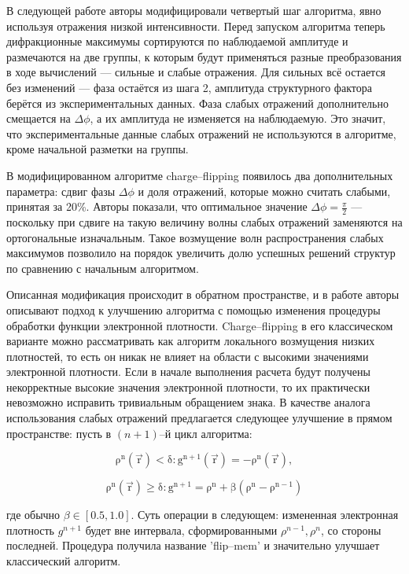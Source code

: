 В следующей работе \cite{oszlanyi_it_2005} авторы модифицировали четвертый шаг алгоритма, явно используя отражения низкой интенсивности. Перед запуском алгоритма теперь дифракционные максимумы сортируются по наблюдаемой амплитуде и размечаются на две группы, к которым будут применяться разные преобразования в ходе вычислений --- сильные и слабые отражения. Для сильных всё остается без изменений --- фаза остаётся из шага 2, амплитуда структурного фактора берётся из экспериментальных данных. Фаза слабых отражений дополнительно смещается на $\Delta\phi$, а их амплитуда не изменяется на наблюдаемую. Это значит, что экспериментальные данные слабых отражений не используются в алгоритме, кроме начальной разметки на группы.

В модифицированном алгоритме charge--flipping появилось два дополнительных параметра: сдвиг фазы $\Delta\phi$ и доля отражений, которые можно считать слабыми, принятая за 20\%. Авторы показали, что оптимальное значение $\Delta\phi = \frac{\pi}{2}$ --- поскольку при сдвиге на такую величину волны слабых отражений заменяются на ортогональные изначальным. Такое возмущение волн распространения слабых максимумов позволило на порядок увеличить долю успешных решений структур по сравнению с начальным алгоритмом.

Описанная модификация происходит в обратном пространстве, и в работе \cite{oszlanyi_charge_2008} авторы описывают подход к улучшению алгоритма с помощью изменения процедуры обработки функции электронной плотности. Charge--flipping в его классическом варианте можно рассматривать как алгоритм локального возмущения низких плотностей, то есть он никак не влияет на области с высокими значениями электронной плотности. Если в начале выполнения расчета будут получены некорректные высокие значения электронной плотности, то их практически невозможно исправить тривиальным обращением знака. В качестве аналога использования слабых отражений предлагается следующее улучшение в прямом пространстве: пусть в $(n+1)$--й цикл алгоритма:


\begin{equation}
	\mathrm{\rho^n(\overrightarrow{r}) < \delta: g^{n+1}(\overrightarrow{r}) = -\rho^n(\overrightarrow{r})},
\end{equation}
 
 
\begin{equation}
	\mathrm{\rho^n(\overrightarrow{r}) \geq \delta: g^{n+1} = \rho^n + \beta(\rho^n-\rho^{n-1})}
\end{equation} 
  
где обычно $\beta\in[0.5,1.0]$. Суть операции в следующем: измененная электронная плотность $g^{n+1}$ будет вне интервала, сформированными $\rho^{n-1}, \rho^{n}$, со стороны последней. Процедура получила название 'flip--mem' и значительно улучшает классический алгоритм.

